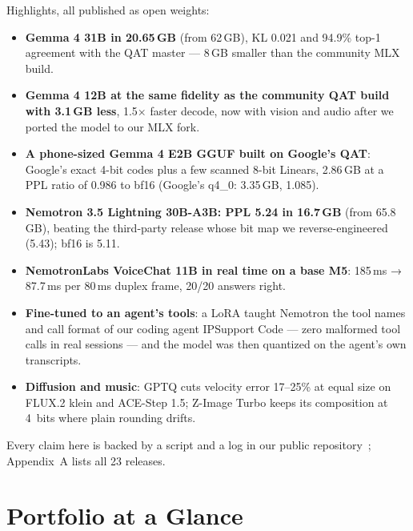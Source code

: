 \documentclass[10pt,letterpaper]{article}
\begin{document}
Highlights, all published as open weights:
\begin{itemize}
  \item \textbf{Gemma 4 31B in 20.65\,GB} (from 62\,GB), KL 0.021 and 94.9\% top-1 agreement with the QAT master --- 8\,GB smaller than the community MLX build.
  \item \textbf{Gemma 4 12B at the same fidelity as the community QAT build with 3.1\,GB less}, 1.5× faster decode, now with vision and audio after we ported the model to our MLX fork.
  \item \textbf{A phone-sized Gemma 4 E2B GGUF built on Google's QAT}: Google's exact 4-bit codes plus a few scanned 8-bit Linears, 2.86\,GB at a PPL ratio of 0.986 to bf16 (Google's q4\_0: 3.35\,GB, 1.085).
  \item \textbf{Nemotron 3.5 Lightning 30B-A3B: PPL 5.24 in 16.7\,GB} (from 65.8\,GB), beating the third-party release whose bit map we reverse-engineered (5.43); bf16 is 5.11.
  \item \textbf{NemotronLabs VoiceChat 11B in real time on a base M5}: 185\,ms → 87.7\,ms per 80\,ms duplex frame, 20/20 answers right.
  \item \textbf{Fine-tuned to an agent's tools}: a LoRA taught Nemotron the tool names and call format of our coding agent IPSupport Code --- zero malformed tool calls in real sessions --- and the model was then quantized on the agent's own transcripts.
  \item \textbf{Diffusion and music}: GPTQ cuts velocity error 17--25\% at equal size on FLUX.2 klein and ACE-Step 1.5; Z-Image Turbo keeps its composition at 4~bits where plain rounding drifts.
\end{itemize}

Every claim here is backed by a script and a log in our public repository~\cite{repo}; Appendix~A lists all 23 releases.

\clearpage
\section{Portfolio at a Glance}
\end{document}
